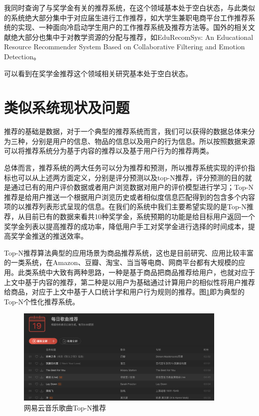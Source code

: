 我同时查询了与奖学金有关的推荐系统，在这个领域基本处于空白状态，与此类似的系统绝大部分集中于对应届生进行工作推荐，如大学生兼职电商平台工作推荐系统的实现\cite{郭洁畅2017大学生兼职电商平台工作推荐系统的实现}、一种面向冷启动学生用户的工作推荐系统及推荐方法\cite{一种面向冷启动学生用户的工作推荐系统及推荐方法}等。国外的相关文献绝大部分也集中于对教学资源的分配与推荐，如EduRecomSys: An Educational Resource Recommender System Based on Collaborative Filtering and Emotion Detection\cite{bustos2020edurecomsys}。

可以看到在奖学金推荐这个领域相关研究基本处于空白状态。

\section{类似系统现状及问题}

推荐的基础是数据，对于一个典型的推荐系统而言，我们可以获得的数据总体来分为三种，分别是用户的信息、物品的信息以及用户的行为信息。所以按照数据来源可以将推荐系统分为基于内容的推荐以及基于用户行为的推荐两类。

总体而言，推荐系统的两大任务可以分为推荐和预测，所以推荐系统实现的评价指标也可以从上述两方面定义，分别是评分预测以及top-N推荐，评分预测的目的就是通过已有的用户评价数据或者用户浏览数据对用户的评价模型进行学习；Top-N推荐是给用户推送一个根据用户浏览历史或者相似度信息匹配得到的包含多个内容项的以推荐列表形式呈现的信息。在我们的系统中我们主要希望实现的是Top-N推荐，从目前已有的数据来看共10种奖学金，系统预期的功能是给目标用户返回一个奖学金列表以提高推荐的成功率，降低用户手工对奖学金进行选择的时间成本，提高奖学金推送的推送效率。

Top-N推荐算法典型的应用场景为商品推荐系统，这也是目前研究、应用比较丰富的一类系统，在Amazon、豆瓣、淘宝、当当等电商、网商平台都有大规模的应用。此类系统中大致有两种思路，一种是基于商品把商品推荐给用户，也就对应于上文中基于内容的推荐，第二种是以用户为基础通过计算用户的相似性将用户推荐给商品，对应于上文中基于人口统计学和用户行为规则的推荐。图\ref{NetEase_Music}即为典型的Top-N个性化推荐系统。

\begin{figure}[htbp]
    \vspace{3pt} %
    \centering
    \includegraphics[width=0.9\textwidth]{images/NetEaseMusic.png}
    \caption{网易云音乐歌曲Top-N推荐}\label{NetEase_Music} %
  \end{figure}

